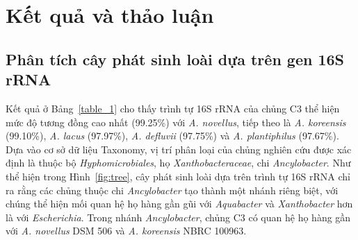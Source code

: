 \documentclass[journal]{IEEEtran}
\begin{document}
	\section{Kết quả và thảo luận}
	
	\subsection{Phân tích cây phát sinh loài dựa trên gen 16S rRNA}
	
	Kết quả ở Bảng~\ref{table_1} cho thấy trình tự 16S rRNA của chủng C3 thể hiện mức độ tương đồng cao nhất (99.25\%) với \textit{A. novellus}, tiếp theo là \textit{A. koreensis} (99.10\%), \textit{A. lacus} (97.97\%), \textit{A. defluvii} (97.75\%) và \textit{A. plantiphilus} (97.67\%). Dựa vào cơ sở dữ liệu Taxonomy, vị trí phân loại của chủng nghiên cứu được xác định là thuộc bộ \textit{Hyphomicrobiales}, họ \textit{Xanthobacteraceae}, chi \textit{Ancylobacter}. Như thể hiện trong Hình~\ref{fig:tree}, cây phát sinh loài dựa trên trình tự 16S rRNA chỉ ra rằng các chủng thuộc chi \textit{Ancylobacter} tạo thành một nhánh riêng biệt, với chúng thể hiện mối quan hệ họ hàng gần gũi với \textit{Aquabacter} và \textit{Xanthobacter} hơn là với \textit{Escherichia}. Trong nhánh \textit{Ancylobacter}, chủng C3 có quan hệ họ hàng gần với \textit{A. novellus} DSM 506 và \textit{A. koreensis} NBRC 100963.
	
	\renewcommand{\arraystretch}{1.35}
	
\end{document}
